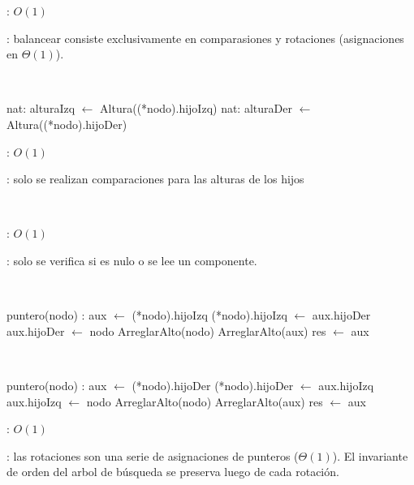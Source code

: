 \begin{Algoritmos}
	\complejidad: $O(1)$

	\justifcomp: balancear consiste exclusivamente en comparasiones y rotaciones (asignaciones en $\Theta(1)$).

	~

	\begin{algorithm}[H]
		\NoCaptionOfAlgo
		\caption{}
		nat: alturaIzq $\leftarrow$ Altura((*nodo).hijoIzq)
		nat: alturaDer $\leftarrow$ Altura((*nodo).hijoDer)
	\end{algorithm}
	
	\complejidad: $O(1)$

	\justifcomp: solo se realizan comparaciones para  las alturas de los hijos

	~

	\begin{algorithm}[H]
		\NoCaptionOfAlgo
		\caption{}
	\end{algorithm}
	
	\complejidad: $O(1)$

	\justifcomp: solo se verifica si es nulo o se lee un componente.

	~

	\begin{algorithm}[H]
		\NoCaptionOfAlgo
		\caption{}
		puntero(nodo) : aux $\leftarrow$ (*nodo).hijoIzq
		(*nodo).hijoIzq $\leftarrow$ aux.hijoDer
		aux.hijoDer $\leftarrow$ nodo
		ArreglarAlto(nodo)
		ArreglarAlto(aux)
		res $\leftarrow$ aux
	\end{algorithm}

	~

	\begin{algorithm}[H]
		\NoCaptionOfAlgo
		\caption{}
		puntero(nodo) : aux $\leftarrow$ (*nodo).hijoDer
		(*nodo).hijoDer $\leftarrow$ aux.hijoIzq
		aux.hijoIzq $\leftarrow$ nodo
		ArreglarAlto(nodo)
		ArreglarAlto(aux)
		res $\leftarrow$ aux
	\end{algorithm}
	
	\complejidad: $O(1)$

	\justifcomp: las rotaciones son una serie de asignaciones de punteros ($\Theta(1)$). El invariante de orden del arbol de búsqueda se preserva luego de cada rotación. 

\end{Algoritmos}